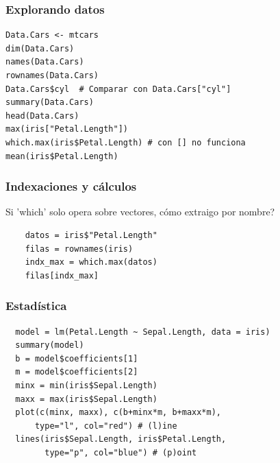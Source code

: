 \documentclass[14pt,aspectratio=169,xcolor=dvipsnames]{beamer}
\begin{document}
\begin{frame}[fragile]\frametitle{Explorando datos}
    \begin{verbatim}
Data.Cars <- mtcars 
dim(Data.Cars)
names(Data.Cars) 
rownames(Data.Cars)
Data.Cars$cyl  # Comparar con Data.Cars["cyl"]
summary(Data.Cars)
head(Data.Cars)
max(iris["Petal.Length"]) 
which.max(iris$Petal.Length) # con [] no funciona
mean(iris$Petal.Length)
    \end{verbatim}
\end{frame}
\begin{frame}[fragile]\frametitle{Indexaciones y cálculos}
Si 'which' solo opera sobre vectores, cómo extraigo por nombre? \pause

    \begin{verbatim}  
    datos = iris$"Petal.Length"
    filas = rownames(iris)
    indx_max = which.max(datos)
    filas[indx_max]
    \end{verbatim}
\end{frame}
\begin{frame}[fragile]\frametitle{Estadística}
    \begin{small}
\begin{verbatim}
  model = lm(Petal.Length ~ Sepal.Length, data = iris)
  summary(model)
  b = model$coefficients[1]
  m = model$coefficients[2]
  minx = min(iris$Sepal.Length)
  maxx = max(iris$Sepal.Length)
  plot(c(minx, maxx), c(b+minx*m, b+maxx*m), 
      type="l", col="red") # (l)ine
  lines(iris$Sepal.Length, iris$Petal.Length, 
        type="p", col="blue") # (p)oint
\end{verbatim}
    \end{small}
\end{frame}

\end{document}
